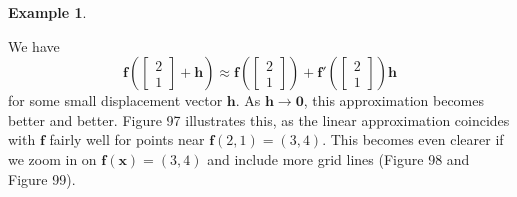 \documentclass{article}
\newcommand{\x}{\mathbf{x}}
\newcommand{\f}{\mathbf{f}}
\newcommand{\h}{\mathbf{h}}
\newcommand{\ze}{\mathbf{0}}
\theoremstyle{definition}
\newtheorem{example}{Example}[section]
\begin{document}
\begin{example}
		\begin{figure}[h!]
			\centering
			\caption{}
		\end{figure}	
		We have $$  \f\left(\begin{bmatrix}
			2\\1
		\end{bmatrix}+\h\right) \approx \f\left( \begin{bmatrix}
			2\\1
		\end{bmatrix}\right) + \f' \left(\begin{bmatrix}
			2\\1
		\end{bmatrix}\right)\h$$ for some small displacement vector $ \h $. As $ \h \to \ze $, this approximation becomes better and better. Figure 97 illustrates this, as the linear approximation coincides with $ \f $ fairly well for points near $  \f(2,1) = (3,4) $. This becomes even clearer if we zoom in on $ \f(\x)=(3,4) $ and include more grid lines (Figure 98 and Figure 99). 
		\begin{figure}[h!]
			\centering
\end{figure}
\end{example}
\end{document}
